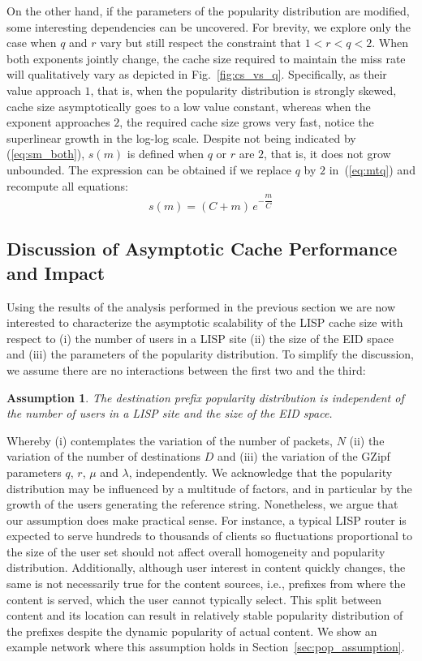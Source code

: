 \documentclass[twocolumn, 10pt]{article}
\theoremstyle{plain}
\newtheorem{assumption}{Assumption}
\begin{document}
On the other hand, if the parameters of the popularity distribution are
modified, some interesting dependencies can be uncovered. For brevity, we explore only the
case when $q$ and $r$ vary but still respect the constraint that $1<r<q<2$. 
When both exponents jointly change, the cache size required to
maintain the miss rate will qualitatively vary as depicted in
Fig.~\ref{fig:cs_vs_q}. Specifically, as their value approach $1$, that is,
when the popularity distribution is strongly skewed, cache size asymptotically
goes to a low value constant, whereas when the exponent approaches $2$, the
required cache size grows very fast, notice the superlinear growth in the
log-log scale. Despite not being indicated by (\ref{eq:sm_both}), $s(m)$ is
defined when $q$ or $r$ are $2$, that is, it does not grow unbounded. The
expression can be obtained if we replace $q$ by $2$ in~(\ref{eq:mtq}) and
recompute all equations:
\begin{equation}
    s(m) = (C+m)\, e^{-\dfrac{m}{C}} 
    \label{sm_log}
\end{equation}



\subsection{Discussion of Asymptotic Cache Performance and Impact}

Using the results of the analysis performed in the previous section we are now
interested to characterize the asymptotic scalability of the LISP cache size
with respect to (i) the number of users in a LISP site (ii) the size of the
EID space and (iii) the parameters of the popularity distribution. To simplify
the discussion, we assume there are no interactions between the first two and
the third:

\begin{assumption}
    The destination prefix popularity distribution is independent of the
    number of users in a LISP site and the size of the EID space.
\end{assumption}

Whereby (i) contemplates the variation of the number of packets, $N$ (ii) the
variation of the number of destinations $D$ and (iii) the variation of the
GZipf parameters $q$, $r$, $\mu$ and $\lambda$, independently. We acknowledge that the
popularity distribution may be influenced by a multitude of factors, and in
particular by the growth of the users generating the reference string.
Nonetheless, we argue that our assumption does make practical sense.  For
instance, a typical LISP router is expected to serve hundreds to thousands of
clients so fluctuations proportional to the size of the user set should
not affect overall homogeneity and popularity distribution.  Additionally,
although user interest in content quickly changes, the same is not necessarily
true for the content sources, i.e., prefixes from where the content is
served, which the user cannot typically select. This split between content and its
location can result in relatively stable popularity distribution of the 
prefixes despite the dynamic popularity of actual content. We show an example
network where this assumption holds in Section~\ref{sec:pop_assumption}.  
\end{document}
